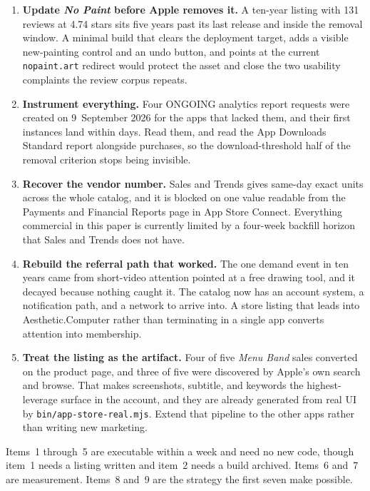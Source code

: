 \documentclass[10pt,letterpaper,twocolumn]{article}
\newcommand{\acdot}{{\color{acpink}.}}
\newcommand{\ac}{Aesthetic{\acdot}Computer}
\begin{document}
\begin{enumerate}
\item \textbf{Update \emph{No Paint} before Apple removes it.} A
ten-year listing with 131 reviews at 4.74 stars sits five years past its
last release and inside the removal window. A minimal build that clears
the deployment target, adds a visible new-painting control and an undo
button, and points at the current \texttt{nopaint.art} redirect would
protect the asset and close the two usability complaints the review
corpus repeats.

\item \textbf{Instrument everything.} Four ONGOING analytics report
requests were created on 9~September 2026 for the apps that lacked them,
and their first instances land within days. Read them, and read the App
Downloads Standard report alongside purchases, so the download-threshold
half of the removal criterion stops being invisible.

\item \textbf{Recover the vendor number.} Sales and Trends gives
same-day exact units across the whole catalog, and it is blocked on one
value readable from the Payments and Financial Reports page in App Store
Connect. Everything commercial in this paper is currently limited by a
four-week backfill horizon that Sales and Trends does not have.

\item \textbf{Rebuild the referral path that worked.} The one demand
event in ten years came from short-video attention pointed at a free
drawing tool, and it decayed because nothing caught it. The catalog now
has an account system, a notification path, and a network to arrive
into. A store listing that leads into \ac{} rather than terminating in a
single app converts attention into membership.

\item \textbf{Treat the listing as the artifact.} Four of five
\emph{Menu Band} sales converted on the product page, and three of five
were discovered by Apple's own search and browse. That makes screenshots,
subtitle, and keywords the highest-leverage surface in the account, and
they are already generated from real UI by
\texttt{bin/app-store-real.mjs}. Extend that pipeline to the other apps
rather than writing new marketing.
\end{enumerate}

Items~1 through~5 are executable within a week and need no new code,
though item~1 needs a listing written and item~2 needs a build archived.
Items~6 and~7 are measurement. Items~8 and~9 are the strategy the first
seven make possible.
\end{document}
